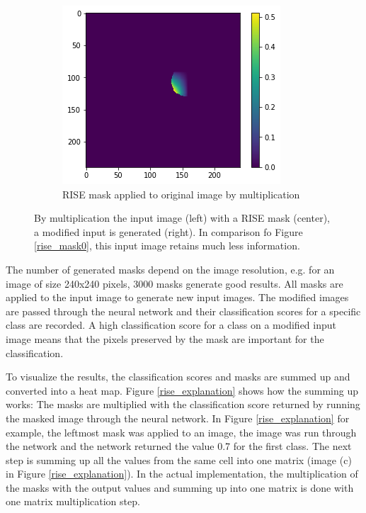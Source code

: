 \begin{figure}[H]
\begin{subfigure}[t]{.32\textwidth}
    \end{subfigure}\hfill%
    \begin{subfigure}[t]{.32\textwidth}
        \centering
        \includegraphics[width=\linewidth]{chapters/02_methods/images/rise/rise1_applied.png}
        \caption{RISE mask applied to original image by multiplication}
    \end{subfigure}
    \caption{By multiplication the input image (left) with a RISE mask (center), a modified input is generated (right). In comparison fo Figure \ref{rise_mask0}, this input image retains much less information.}
    \label{rise_mask1}
\end{figure}

The number of generated masks depend on the image resolution, e.g. for an image of size 240x240 pixels, 3000 masks generate good results. All masks are applied to the input image to generate new input images. The modified images are passed through the neural network and their classification scores for a specific class are recorded. A high classification score for a class on a modified input image means that the pixels preserved by the mask are important for the classification.

To visualize the results, the classification scores and masks are summed up and converted into a heat map. Figure \ref{rise_explanation} shows how the summing up works: The masks are multiplied with the classification score returned by running the masked image through the neural network. In Figure \ref{rise_explanation} for example, the leftmost mask was applied to an image, the image was run through the network and the network returned the value 0.7 for the first class. The next step is summing up all the values from the same cell into one matrix (image (c) in Figure \ref{rise_explanation}). In the actual implementation, the multiplication of the masks with the output values and summing up into one matrix is done with one matrix multiplication step.

